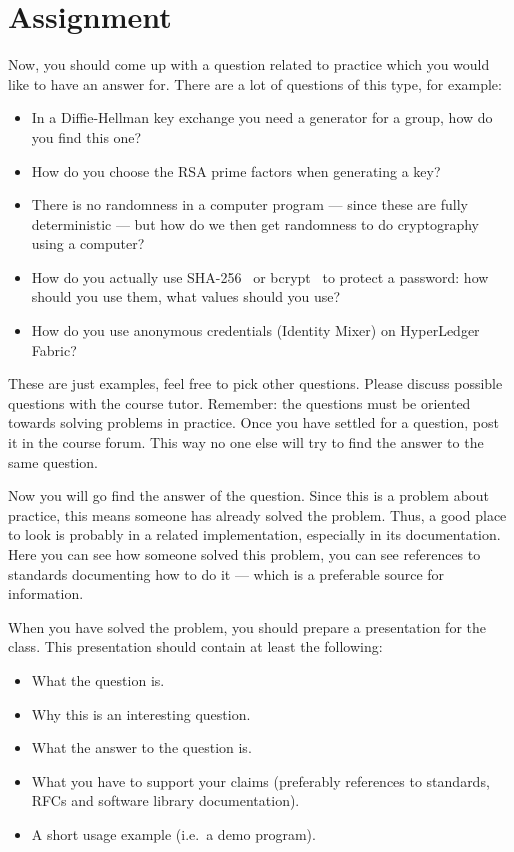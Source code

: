 \section{Assignment}%
\label{sec:tasks}
Now, you should come up with a question related to practice which you would 
like to have an answer for.
There are a lot of questions of this type, for example:
\begin{itemize}
  \item In a Diffie-Hellman key exchange you need a generator for a group, how 
    do you find this one?

  \item How do you choose the RSA prime factors when generating a key?

  \item There is no randomness in a computer program --- since these are fully 
    deterministic --- but how do we then get randomness to do cryptography 
    using a computer?

  \item How do you actually use SHA-256~\cite{shs} or bcrypt~\cite{bcrypt} to 
    protect a password: how should you use them, what values should you use?

  \item How do you use anonymous credentials (Identity Mixer) on HyperLedger 
    Fabric?
\end{itemize}
These are just examples, feel free to pick other questions.
Please discuss possible questions with the course tutor.
Remember: the questions must be oriented towards solving problems in practice.
Once you have settled for a question, post it in the course forum.
This way no one else will try to find the answer to the same question.

Now you will go find the answer of the question.
Since this is a problem about practice, this means someone has already solved 
the problem.
Thus, a good place to look is probably in a related implementation, especially 
in its documentation.
Here you can see how someone solved this problem, you can see references to 
standards documenting how to do it --- which is a preferable source for 
information.

When you have solved the problem, you should prepare a presentation for the 
class.
This presentation should contain at least the following:
\begin{itemize}
  \item What the question is.
  \item Why this is an interesting question.
  \item What the answer to the question is.
  \item What you have to support your claims (preferably references to 
    standards, RFCs and software library documentation).
  \item A short usage example (i.e.~a demo program).
\end{itemize}



